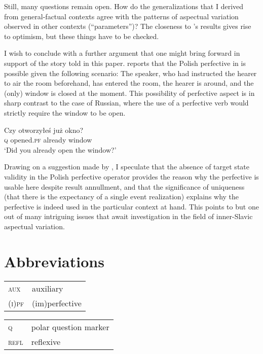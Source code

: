 \documentclass[output=paper,
modfonts,
newtxmath,
hidelinks
]{langscibook}
\begin{document}
\noindent Still, many questions remain open. How do the generalizations that I derived from general-factual contexts agree with the patterns of aspectual variation observed in other
contexts (``parameters'')? The closeness to \citeauthor{Stunova1991}'s results gives rise to optimism, but these things have to be checked.  

I wish to conclude with a further argument that one might bring forward in support of the story told in this paper. 
\citet[112]{Dickey2000} reports that the Polish perfective in  is possible given the following scenario: 
The speaker, who had instructed the hearer to air the room beforehand, has entered the room, the hearer is around, and the (only) window is closed at the moment.   
This possibility of perfective aspect is in sharp contrast to the case of Russian, where the 
use of a perfective verb would strictly require the window to be open. 

\begin{exe}
\ex\label{win}
\gll Czy otworzy\l{e}\'s ju\.z okno? \\
\textsc{q} opened.\textsc{pf} already window\\
\glt `Did you already open the window?'
\end{exe}

\noindent Drawing on a suggestion made by \citet[84]{Dickey18}, I speculate that the absence of target state validity in the Polish perfective operator provides the reason why the perfective is usable here despite result annullment, 
and that the significance of uniqueness (that there is the expectancy of a single event realization) explains why the perfective is indeed used in the particular context at hand. 
This points to but one out of many intriguing issues that await investigation in the field of inner-Slavic aspectual variation.  






\section*{Abbreviations}

\begin{tabularx}{.45\textwidth}{lQ}
\textsc{aux} & auxiliary \\
\textsc{(i)pf} & (im)perfective\\
\end{tabularx}
\begin{tabularx}{.45\textwidth}{lQ}
\textsc{q}&polar question marker\\
\textsc{refl}&reflexive\\
\end{tabularx}
\end{document}
